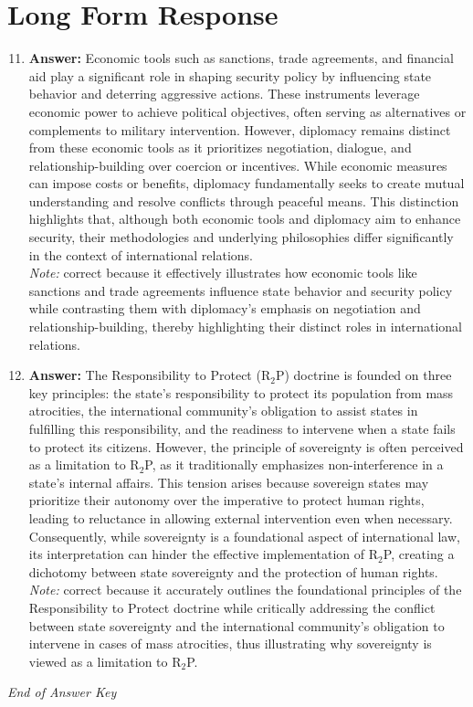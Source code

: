 \documentclass[12pt]{article}
\begin{document}
\section*{Long Form Response}
\begin{enumerate}[label=\arabic*.]
\setcounter{enumi}{10}
\item \textbf{Answer:} Economic tools such as sanctions, trade agreements, and financial aid play a significant role in shaping security policy by influencing state behavior and deterring aggressive actions. These instruments leverage economic power to achieve political objectives, often serving as alternatives or complements to military intervention. However, diplomacy remains distinct from these economic tools as it prioritizes negotiation, dialogue, and relationship-building over coercion or incentives. While economic measures can impose costs or benefits, diplomacy fundamentally seeks to create mutual understanding and resolve conflicts through peaceful means. This distinction highlights that, although both economic tools and diplomacy aim to enhance security, their methodologies and underlying philosophies differ significantly in the context of international relations.
\\ \textit{Note:} correct because it effectively illustrates how economic tools like sanctions and trade agreements influence state behavior and security policy while contrasting them with diplomacy's emphasis on negotiation and relationship-building, thereby highlighting their distinct roles in international relations.
\item \textbf{Answer:} The Responsibility to Protect (R$_{2}$P) doctrine is founded on three key principles: the state's responsibility to protect its population from mass atrocities, the international community's obligation to assist states in fulfilling this responsibility, and the readiness to intervene when a state fails to protect its citizens. However, the principle of sovereignty is often perceived as a limitation to R$_{2}$P, as it traditionally emphasizes non-interference in a state's internal affairs. This tension arises because sovereign states may prioritize their autonomy over the imperative to protect human rights, leading to reluctance in allowing external intervention even when necessary. Consequently, while sovereignty is a foundational aspect of international law, its interpretation can hinder the effective implementation of R$_{2}$P, creating a dichotomy between state sovereignty and the protection of human rights.
\\ \textit{Note:} correct because it accurately outlines the foundational principles of the Responsibility to Protect doctrine while critically addressing the conflict between state sovereignty and the international community's obligation to intervene in cases of mass atrocities, thus illustrating why sovereignty is viewed as a limitation to R$_{2}$P.
\end{enumerate}

\vfill
\noindent\textit{End of Answer Key}
\end{document}
